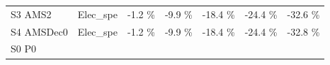 \documentclass[]{article}
\begin{document}
\begin{longtable}[]{@{}lllllll@{}}
\begin{minipage}[t]{0.14\columnwidth}\raggedright\strut
S3 AMS2\strut
\end{minipage} & \begin{minipage}[t]{0.13\columnwidth}\raggedright\strut
Elec\_spe\strut
\end{minipage} & \begin{minipage}[t]{0.11\columnwidth}\raggedright\strut
-1.2 \%\strut
\end{minipage} & \begin{minipage}[t]{0.11\columnwidth}\raggedright\strut
-9.9 \%\strut
\end{minipage} & \begin{minipage}[t]{0.11\columnwidth}\raggedright\strut
-18.4 \%\strut
\end{minipage} & \begin{minipage}[t]{0.11\columnwidth}\raggedright\strut
-24.4 \%\strut
\end{minipage} & \begin{minipage}[t]{0.11\columnwidth}\raggedright\strut
-32.6 \%\strut
\end{minipage}\tabularnewline
\begin{minipage}[t]{0.14\columnwidth}\raggedright\strut
S4 AMSDec0\strut
\end{minipage} & \begin{minipage}[t]{0.13\columnwidth}\raggedright\strut
Elec\_spe\strut
\end{minipage} & \begin{minipage}[t]{0.11\columnwidth}\raggedright\strut
-1.2 \%\strut
\end{minipage} & \begin{minipage}[t]{0.11\columnwidth}\raggedright\strut
-9.9 \%\strut
\end{minipage} & \begin{minipage}[t]{0.11\columnwidth}\raggedright\strut
-18.4 \%\strut
\end{minipage} & \begin{minipage}[t]{0.11\columnwidth}\raggedright\strut
-24.4 \%\strut
\end{minipage} & \begin{minipage}[t]{0.11\columnwidth}\raggedright\strut
-32.8 \%\strut
\end{minipage}\tabularnewline
\begin{minipage}[t]{0.14\columnwidth}\raggedright\strut
S0 P0\strut
\end{minipage} & \begin{minipage}[t]{0.13\columnwidth}\raggedright\strut

\end{minipage}
\end{longtable}
\end{document}
